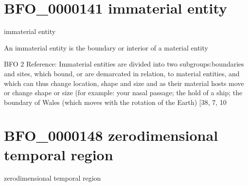\documentclass[letterpaper,10pt,english]{sphinxmanual}
\begin{document}
\section{BFO\_0000141 \sphinxhyphen{} immaterial entity}
\label{\detokenize{doc-BFO_0000141:bfo-0000141-immaterial-entity}}\label{\detokenize{doc-BFO_0000141:index-0}}\label{\detokenize{doc-BFO_0000141::doc}}
\begin{sphinxShadowBox}

\sphinxAtStartPar
immaterial entity
\end{sphinxShadowBox}

\begin{sphinxShadowBox}

\sphinxAtStartPar
An immaterial entity is the boundary or interior of a material entity
\end{sphinxShadowBox}

\begin{sphinxShadowBox}

\sphinxAtStartPar
BFO 2 Reference: Immaterial entities are divided into two subgroups:boundaries and sites, which bound, or are demarcated in relation, to material entities, and which can thus change location, shape and size and as their material hosts move or change shape or size (for example: your nasal passage; the hold of a ship; the boundary of Wales (which moves with the rotation of the Earth) {[}38, 7, 10
\end{sphinxShadowBox}

\begin{sphinxShadowBox}

\sphinxAtStartPar
{}
\end{sphinxShadowBox}
\begin{quote}
\label{\detokenize{doc-BFO_0000148:bfo-0000148}}\label{\detokenize{doc-BFO_0000148:zero-dimensional-temporal-region}}\label{\detokenize{doc-BFO_0000148:bfo-0000148}}
\ignorespaces \end{quote}


\section{BFO\_0000148 \sphinxhyphen{} zero\sphinxhyphen{}dimensional temporal region}
\label{\detokenize{doc-BFO_0000148:bfo-0000148-zero-dimensional-temporal-region}}\label{\detokenize{doc-BFO_0000148:index-0}}\label{\detokenize{doc-BFO_0000148::doc}}
\begin{sphinxShadowBox}

\sphinxAtStartPar
zero\sphinxhyphen{}dimensional temporal region
\end{sphinxShadowBox}
\end{document}

